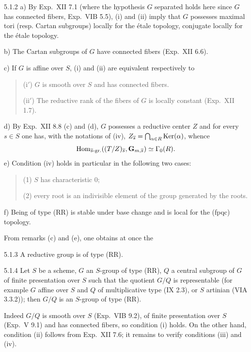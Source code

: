 \begin{remark}{5.1.2}\label{XXII.5.1.2}
a) By Exp.~XII 7.1 (where the hypothesis $G$ separated holds here since $G$ has connected fibers, \cf Exp.~VIB 5.5), (i) and (ii) imply that $G$ possesses maximal tori (resp. Cartan subgroups) locally for the \'etale topology, conjugate locally for the \'etale topology.

b) The Cartan subgroups of $G$ have connected fibers (Exp.~XII 6.6).

c) If $G$ is affine over $S$, (i) and (ii) are equivalent respectively to
\begin{quote}
(i$'$) $G$ is smooth over $S$ and has connected fibers.

(ii$'$) The reductive rank of the fibers of $G$ is locally constant (Exp.~XII 1.7).
\end{quote}
d) By Exp.~XII 8.8 (c) and (d), $G$ possesses a reductive center $Z$ and for every $s\in S$ one has, with the notations of (iv),{\renewcommand{\thefootnote}{(24)}} $Z_{\overline s}=\bigcap_{\alpha\in R}\operatorname{Ker}(\alpha)$, whence
\[
\operatorname{Hom}_{\overline s\text{-gr.}}((T/Z)_{\overline s},\mathbf G_{m,\overline s})\simeq\Gamma_0(R).
\]
e) Condition (iv) holds in particular in the following two cases:
\begin{quote}
(1) $S$ has characteristic $0$;

(2) every root is an indivisible element of the group generated by the roots.
\end{quote}
f) Being of type (RR) is stable under base change and is local for the (fpqc) topology.
\end{remark}
From remarks (c) and (e), one obtains at once the
\begin{proposition}{5.1.3}\label{XXII.5.1.3}
A reductive group is of type (RR).
\end{proposition}
\begin{proposition}{5.1.4}\label{XXII.5.1.4}
Let $S$ be a scheme, $G$ an $S$-group of type (RR), $Q$ a central subgroup of $G$ of finite presentation over $S$ such that the quotient $G/Q$ is representable (for example $G$ affine over $S$ and $Q$ of multiplicative type (IX 2.3), or $S$ artinian (VIA 3.3.2)); then $G/Q$ is an $S$-group of type (RR).
\end{proposition}
Indeed $G/Q$ is smooth over $S$ (Exp.~VIB 9.2), of finite presentation over $S$ (Exp.~V 9.1) and has connected fibers, so condition (i) holds. On the other hand, condition (ii) follows from Exp.~XII 7.6; it remains to verify conditions (iii) and (iv).

